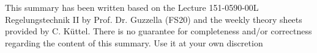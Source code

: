 



\maketitle
\begin{center}
    \parbox{0.5\linewidth}{\begin{center}
        This summary has been written based on the Lecture 151-0590-00L Regelungstechnik II by Prof. Dr. Guzzella (FS20) and the weekly theory sheets provided by C. Küttel. There is no guarantee for completeness and/or correctness regarding the content of this summary. Use it at your own discretion
    \end{center}}
\end{center}
\newpage

\begin{center}
    \begin{multicols*}{3}
        \tableofcontents
    \end{multicols*}
\end{center}

